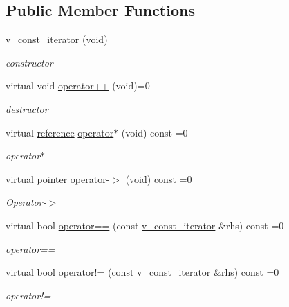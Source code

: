 \subsection*{Public Member Functions}
\begin{DoxyCompactItemize}
\item 
\mbox{\hyperlink{group___thin_var_dep_interface___c_l_a_s_s_e_s_ga4dd97dbbd38cc26107a54416354a2a01}{v\+\_\+const\+\_\+iterator}} (void)
\begin{DoxyCompactList}\small\item\em constructor \end{DoxyCompactList}\item 
virtual void \mbox{\hyperlink{group___thin_var_dep_interface___c_l_a_s_s_e_s_ga79fc9d17094dc591d6b48bc296028d51}{operator++}} (void)=0
\begin{DoxyCompactList}\small\item\em destructor \end{DoxyCompactList}\item 
virtual \mbox{\hyperlink{class_s_m_spp__di__unipi__it_1_1_variable}{reference}} \mbox{\hyperlink{group___thin_var_dep_interface___c_l_a_s_s_e_s_gabce2a2d16159da29402d5561d6e0e28c}{operator$\ast$}} (void) const =0
\begin{DoxyCompactList}\small\item\em operator$\ast$ \end{DoxyCompactList}\item 
virtual \mbox{\hyperlink{class_s_m_spp__di__unipi__it_1_1_variable}{pointer}} \mbox{\hyperlink{group___thin_var_dep_interface___c_l_a_s_s_e_s_gab6b157ee55dad2dd8215f31aafbdd35f}{operator-\/$>$}} (void) const =0
\begin{DoxyCompactList}\small\item\em Operator-\/$>$ \end{DoxyCompactList}\item 
virtual bool \mbox{\hyperlink{group___thin_var_dep_interface___c_l_a_s_s_e_s_gae057869085d3845118bd5cf033129e43}{operator==}} (const \mbox{\hyperlink{class_s_m_spp__di__unipi__it_1_1_thin_var_dep_interface_1_1v__const__iterator}{v\+\_\+const\+\_\+iterator}} \&rhs) const =0
\begin{DoxyCompactList}\small\item\em operator== \end{DoxyCompactList}\item 
virtual bool \mbox{\hyperlink{group___thin_var_dep_interface___c_l_a_s_s_e_s_ga042a02e36885666d678408d678b499e7}{operator!=}} (const \mbox{\hyperlink{class_s_m_spp__di__unipi__it_1_1_thin_var_dep_interface_1_1v__const__iterator}{v\+\_\+const\+\_\+iterator}} \&rhs) const =0
\begin{DoxyCompactList}\small\item\em operator!= \end{DoxyCompactList}\end{DoxyCompactItemize}


